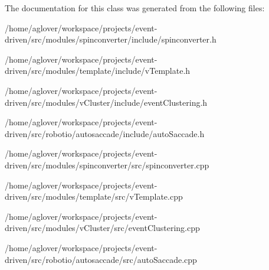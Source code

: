 The documentation for this class was generated from the following files\+:\begin{DoxyCompactItemize}
\item 
/home/aglover/workspace/projects/event-\/driven/src/modules/spinconverter/include/spinconverter.\+h\item 
/home/aglover/workspace/projects/event-\/driven/src/modules/template/include/v\+Template.\+h\item 
/home/aglover/workspace/projects/event-\/driven/src/modules/v\+Cluster/include/event\+Clustering.\+h\item 
/home/aglover/workspace/projects/event-\/driven/src/robotio/autosaccade/include/auto\+Saccade.\+h\item 
/home/aglover/workspace/projects/event-\/driven/src/modules/spinconverter/src/spinconverter.\+cpp\item 
/home/aglover/workspace/projects/event-\/driven/src/modules/template/src/v\+Template.\+cpp\item 
/home/aglover/workspace/projects/event-\/driven/src/modules/v\+Cluster/src/event\+Clustering.\+cpp\item 
/home/aglover/workspace/projects/event-\/driven/src/robotio/autosaccade/src/auto\+Saccade.\+cpp\end{DoxyCompactItemize}
